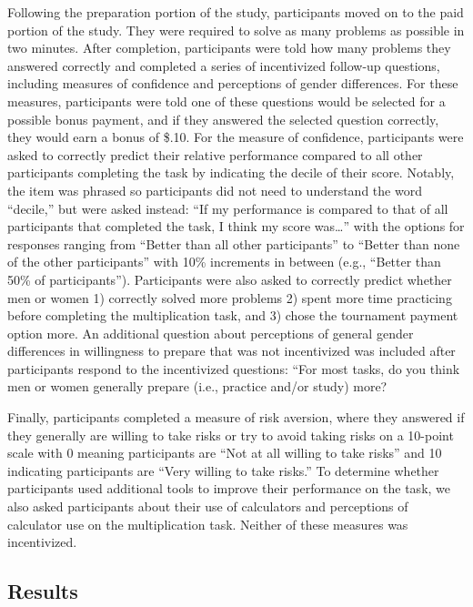 \documentclass[a4paper, nobind]{templates/ociamthesis}
\begin{document}
Following the preparation portion of the study, participants moved on to the paid portion of the study. They were required to solve as many problems as possible in two minutes. After completion, participants were told how many problems they answered correctly and completed a series of incentivized follow-up questions, including measures of confidence and perceptions of gender differences. For these measures, participants were told one of these questions would be selected for a possible bonus payment, and if they answered the selected question correctly, they would earn a bonus of \$.10. For the measure of confidence, participants were asked to correctly predict their relative performance compared to all other participants completing the task by indicating the decile of their score. Notably, the item was phrased so participants did not need to understand the word ``decile,'' but were asked instead: ``If my performance is compared to that of all participants that completed the task, I think my score was\ldots{}'' with the options for responses ranging from ``Better than all other participants'' to ``Better than none of the other participants'' with 10\% increments in between (e.g., ``Better than 50\% of participants''). Participants were also asked to correctly predict whether men or women 1) correctly solved more problems 2) spent more time practicing before completing the multiplication task, and 3) chose the tournament payment option more. An additional question about perceptions of general gender differences in willingness to prepare that was not incentivized was included after participants respond to the incentivized questions: ``For most tasks, do you think men or women generally prepare (i.e., practice and/or study) more?

Finally, participants completed a measure of risk aversion, where they answered if they generally are willing to take risks or try to avoid taking risks \autocite{Dohmen2011} on a 10-point scale with 0 meaning participants are ``Not at all willing to take risks'' and 10 indicating participants are ``Very willing to take risks.'' To determine whether participants used additional tools to improve their performance on the task, we also asked participants about their use of calculators and perceptions of calculator use on the multiplication task. Neither of these measures was incentivized.

\hypertarget{results}{%
\subsection{Results}\label{results}}
\end{document}
